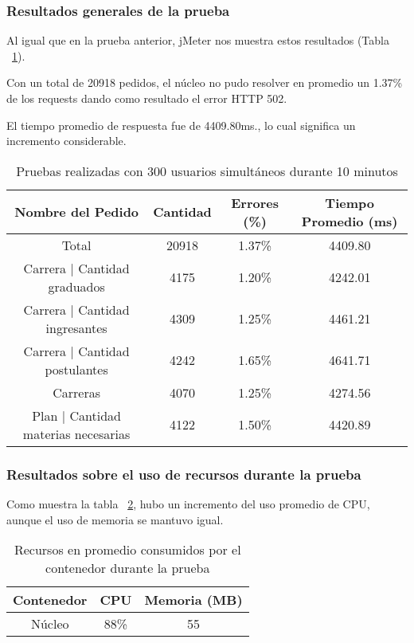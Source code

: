 \subsubsection{Resultados generales de la prueba}

Al igual que en la prueba anterior, jMeter nos muestra estos resultados (Tabla ~\ref{tab:300u_10m_gen}).

Con un total de 20918 pedidos, el núcleo no pudo resolver en promedio un 1.37\% de los requests dando como resultado el error HTTP 502.

El tiempo promedio de respuesta fue de 4409.80ms., lo cual significa un incremento considerable.

\begin{table}[!htbp]
    \centering
    \makegapedcells
    \begin{tabular}{|c|c|c|c|}
    \hline
    Nombre del Pedido & Cantidad & Errores (\%) & Tiempo Promedio (ms) \\ \hline
    Total & 20918 & 1.37\% & 4409.80\\ \hline
    Carrera | Cantidad graduados & 4175 & 1.20\% & 4242.01\\ \hline
    Carrera | Cantidad ingresantes & 4309 & 1.25\% & 4461.21\\ \hline
    Carrera | Cantidad postulantes & 4242 & 1.65\% & 4641.71\\ \hline
    Carreras & 4070 & 1.25\% & 4274.56\\ \hline
    Plan | Cantidad materias necesarias & 4122 & 1.50\% & 4420.89\\ \hline
    \end{tabular}
    \caption{Pruebas realizadas con 300 usuarios simultáneos durante 10 minutos}
    \label{tab:300u_10m_gen}
\end{table}



\subsubsection{Resultados sobre el uso de recursos durante la prueba}

Como muestra la tabla ~\ref{tab:300u_10m_rec}, hubo un incremento del uso promedio de CPU, aunque el uso de memoria se mantuvo igual.

\begin{table}[!htbp]
    \centering
    \makegapedcells
    \begin{tabular}{|c|c|c|}
    \hline
    Contenedor & CPU & Memoria (MB)\\ \hline
    Núcleo & 88\% & 55 \\ \hline
    \end{tabular}
    \caption{Recursos en promedio consumidos por el contenedor durante la prueba}
    \label{tab:300u_10m_rec}
\end{table}

